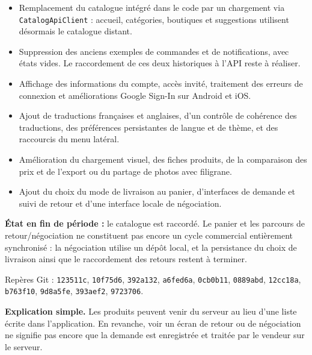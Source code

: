 \documentclass[11pt,letterpaper]{article}
\newcommand{\sectiontitle}[1]{\vspace{0.45em}{\Large\bfseries\color{SequoInk}#1}\par\vspace{0.1em}}
\newcommand{\simpleexplanation}[1]{{\small\textbf{\color{SequoBlue}Explication simple.} \color{SequoMuted}#1\par}}
\newcommand{\evidence}[1]{\par{\footnotesize\color{SequoMuted}Repères Git : #1.\par}}
\begin{document}
\newpage
\sectiontitle{3. Sequo : application client}
\begin{itemize}
  \item Remplacement du catalogue intégré dans le code par un chargement via \texttt{CatalogApiClient} : accueil, catégories, boutiques et suggestions utilisent désormais le catalogue distant.
  \item Suppression des anciens exemples de commandes et de notifications, avec états vides. Le raccordement de ces deux historiques à l'API reste à réaliser.
  \item Affichage des informations du compte, accès invité, traitement des erreurs de connexion et améliorations Google Sign-In sur Android et iOS.
  \item Ajout de traductions françaises et anglaises, d'un contrôle de cohérence des traductions, des préférences persistantes de langue et de thème, et des raccourcis du menu latéral.
  \item Amélioration du chargement visuel, des fiches produits, de la comparaison des prix et de l'export ou du partage de photos avec filigrane.
  \item Ajout du choix du mode de livraison au panier, d'interfaces de demande et suivi de retour et d'une interface locale de négociation.
\end{itemize}
\textbf{État en fin de période :} le catalogue est raccordé. Le panier et les parcours de retour/négociation ne constituent pas encore un cycle commercial entièrement synchronisé : la négociation utilise un dépôt local, et la persistance du choix de livraison ainsi que le raccordement des retours restent à terminer.
\evidence{\texttt{123511c}, \texttt{10f75d6}, \texttt{392a132}, \texttt{a6fed6a}, \texttt{0cb0b11}, \texttt{0889abd}, \texttt{12cc18a}, \texttt{b763f10}, \texttt{9d8a5fe}, \texttt{393aef2}, \texttt{9723706}}
\simpleexplanation{Les produits peuvent venir du serveur au lieu d'une liste écrite dans l'application. En revanche, voir un écran de retour ou de négociation ne signifie pas encore que la demande est enregistrée et traitée par le vendeur sur le serveur.}
\end{document}
